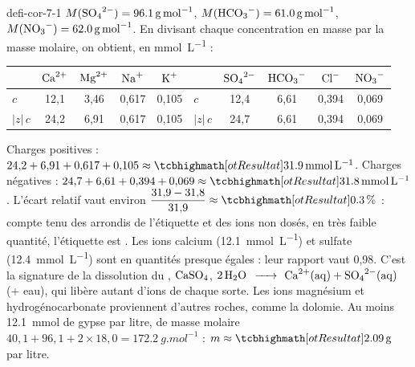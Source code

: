\begin{blocEdition}{defi-cor-7-1}
$M(\ce{SO4^{2-}})=\qty{96,1}{g.mol^{-1}}$, $M(\ce{HCO3-})=\qty{61,0}{g.mol^{-1}}$, $M(\ce{NO3-})=\qty{62,0}{g.mol^{-1}}$. En divisant chaque concentration en masse par la masse
molaire, on obtient, en \unit{mmol.L^{-1}} :
\begin{center}
\begin{tabular}{lcccc@{\qquad}lcccc}
\toprule
 & $\ce{Ca^{2+}}$ & $\ce{Mg^{2+}}$ & $\ce{Na+}$ & $\ce{K+}$ & & $\ce{SO4^{2-}}$ & $\ce{HCO3-}$ & $\ce{Cl-}$ & $\ce{NO3-}$ \\
\midrule
$c$ & 12,1 & 3,46 & 0,617 & 0,105 & $c$ & 12,4 & 6,61 & 0,394 & 0,069 \\
$|z|\,c$ & 24,2 & 6,91 & 0,617 & 0,105 & $|z|\,c$ & 24,7 & 6,61 & 0,394 & 0,069 \\
\bottomrule
\end{tabular}
\end{center}
Charges positives : $24{,}2+6{,}91+0{,}617+0{,}105\approx\res{\qty{31,9}{mmol.L^{-1}}}$. Charges négatives : $24{,}7+6{,}61+0{,}394+0{,}069\approx\res{\qty{31,8}{mmol.L^{-1}}}$.
L'écart relatif vaut environ $\dfrac{31{,}9-31{,}8}{31{,}9}\approx\res{\qty{0,3}{\percent}}$ : compte tenu des arrondis de l'étiquette et des ions non dosés, en
très faible quantité, l'étiquette est .
Les ions calcium (\qty{12,1}{mmol.L^{-1}}) et sulfate (\qty{12,4}{mmol.L^{-1}}) sont en quantités presque égales : leur rapport vaut 0,98. C'est la
signature de la dissolution du , $\ce{CaSO4}$, $2\,\ce{H2O}$ $\ce{->}$ $\ce{Ca^{2+}(aq)}+\ce{SO4^{2-}(aq)}$ (+ eau), qui libère autant d'ions de
chaque sorte. Les ions magnésium et hydrogénocarbonate proviennent d'autres roches, comme la dolomie.
Au moins \qty{12,1}{mmol} de gypse par litre, de masse molaire $40{,}1+96{,}1+2\times18{,}0=\qty{172,2}{g.mol^{-1}}$ : $m\approx\res{\qty{2,09}{g}}$ par litre.
\end{blocEdition}

